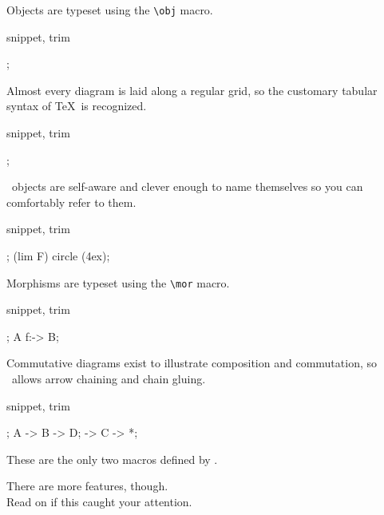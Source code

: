 Objects are typeset using the \lstinline|\obj| macro.

\begin{tcblisting}{snippet, trim}
\begin{kodi}
;
\end{kodi}
\end{tcblisting}

Almost every diagram is laid along a regular grid,
so the customary tabular syntax of \TeX\ is recognized.

\begin{tcblisting}{snippet, trim}
\begin{kodi}
;
\end{kodi}
\end{tcblisting}

\koDi\ objects are self-aware and clever enough to name themselves
so you can comfortably refer to them.

\begin{tcblisting}{snippet, trim}
\begin{kodi}
;
\draw (lim F) circle (4ex);
\end{kodi}
\end{tcblisting}

Morphisms are typeset using the \lstinline!\mor! macro.

\begin{tcblisting}{snippet, trim}
\begin{kodi}
;
\mor A f:-> B;
\end{kodi}
\end{tcblisting}

Commutative diagrams exist to illustrate composition and commutation,
so \koDi\ allows arrow chaining and chain gluing.

\begin{tcblisting}{snippet, trim}
\begin{kodi}
;
\mor A -> B -> D;
\mor * -> C -> *;
\end{kodi}
\end{tcblisting}

These are the only two macros defined by \koDi.

There are more features, though.\\
Read on if this caught your attention.
